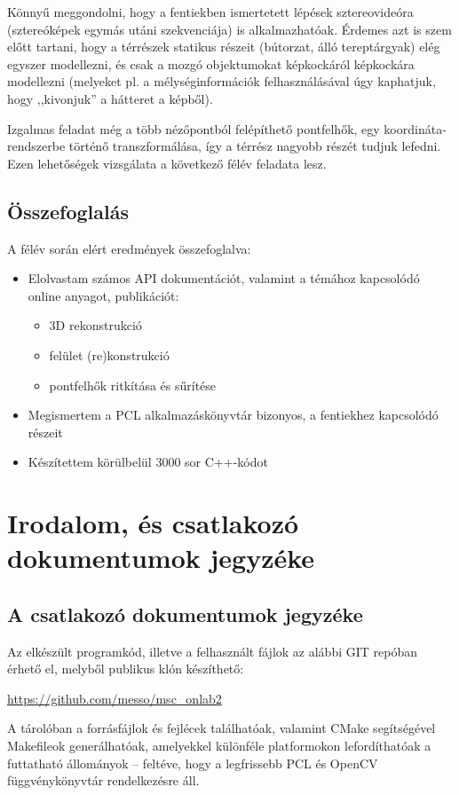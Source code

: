 \documentclass[a4paper,oneside]{article}
\begin{document}
Könnyű meggondolni, hogy a fentiekben ismertetett lépések sztereovideóra (sztereóképek egymás utáni szekvenciája) is alkalmazhatóak. Érdemes azt is szem előtt tartani, hogy a térrészek statikus részeit (bútorzat, álló tereptárgyak) elég egyszer modellezni, és csak a mozgó objektumokat képkockáról képkockára modellezni (melyeket pl. a mélységinformációk felhasználásával úgy kaphatjuk, hogy ,,kivonjuk'' a hátteret a képből).

Izgalmas feladat még a több nézőpontból felépíthető pontfelhők, egy koordináta-rendszerbe történő transzformálása, így a térrész nagyobb részét tudjuk lefedni. Ezen lehetőségek vizsgálata a következő félév feladata lesz.

\subsection{Összefoglalás}
\label{sec:osszefoglalas}

A félév során elért eredmények összefoglalva:
\begin{itemize}
\item Elolvastam számos API dokumentációt, valamint a témához kapcsolódó online anyagot, publikációt:
\begin{itemize}
\item 3D rekonstrukció
\item felület (re)konstrukció
\item pontfelhők ritkítása és sűrítése
\end{itemize}
\item Megismertem a PCL alkalmazáskönyvtár bizonyos, a fentiekhez kapcsolódó részeit
\item Készítettem körülbelül 3000 sor C++-kódot
\end{itemize}

\newpage
 
\section{Irodalom, és csatlakozó dokumentumok jegyzéke}
\label{sec:irod-es-csatl}

\printbibliography[title={Irodalomjegyzék}]

\subsection{A csatlakozó dokumentumok jegyzéke}
\label{sec:csat-irod}

Az elkészült programkód, illetve a felhasznált fájlok az alábbi GIT repóban érhető el, melyből publikus klón készíthető:
\begin{center}
\url{https://github.com/messo/msc_onlab2}
\end{center}

A tárolóban a forrásfájlok és fejlécek találhatóak, valamint CMake segítségével Makefileok generálhatóak, amelyekkel különféle platformokon lefordíthatóak a futtatható állományok -- feltéve, hogy a legfrissebb PCL és OpenCV függvénykönyvtár rendelkezésre áll.
\end{document}
